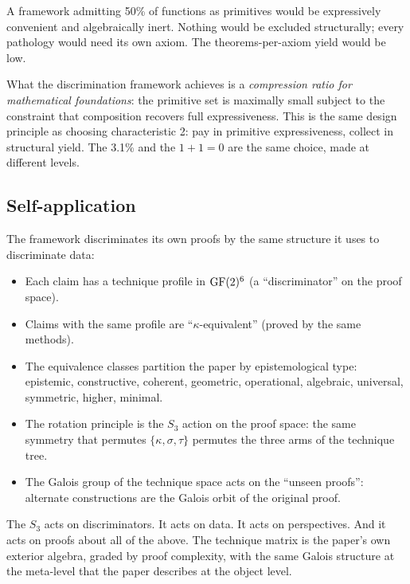 A framework admitting 50\% of functions as primitives
would be expressively convenient and algebraically inert.
Nothing would be excluded structurally; every pathology
would need its own axiom. The theorems-per-axiom yield
would be low.

What the discrimination framework achieves is a
\emph{compression ratio for mathematical foundations}:
the primitive set is maximally small subject to the
constraint that composition recovers full expressiveness.
This is the same design principle as choosing
characteristic 2: pay in primitive expressiveness,
collect in structural yield. The 3.1\% and the $1+1=0$
are the same choice, made at different levels.
\subsection{Self-application}

The framework discriminates its own proofs by the same
structure it uses to discriminate data:
\begin{itemize}[nosep]
  \item Each claim has a technique profile in $\operatorname{GF}(2)^6$
    (a ``discriminator'' on the proof space).
  \item Claims with the same profile are
    ``$\kappa$-equivalent'' (proved by the same methods).
  \item The equivalence classes partition the paper by
    epistemological type: epistemic, constructive,
    coherent, geometric, operational, algebraic,
    universal, symmetric, higher, minimal.
  \item The rotation principle is the $S_3$ action on
    the proof space: the same symmetry that permutes
    $\{\kappa, \sigma, \tau\}$ permutes the three arms
    of the technique tree.
  \item The Galois group of the technique space acts on
    the ``unseen proofs'': alternate constructions are
    the Galois orbit of the original proof.
\end{itemize}

The $S_3$ acts on discriminators. It acts on data. It
acts on perspectives. And it acts on proofs about all
of the above. The technique matrix is the paper's own
exterior algebra, graded by proof complexity, with the
same Galois structure at the meta-level that the paper
describes at the object level.
